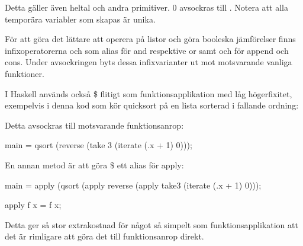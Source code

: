 \documentclass[../Core]{subfiles}
\begin{document}
Detta gäller även heltal och andra primitiver. $0$ avsockras till
. Notera att alla temporära variabler som skapas är unika.
            
    
För att göra det lättare att operera på listor och göra booleska
jämförelser finns infixoperatorerna \ic{\&\&} och \ic{||} som alias för and respektive or
samt \ic{++} och \ic{:} för append och cons. Under avsockringen byts dessa
infixvarianter ut mot motsvarande vanliga funktioner. 


I Haskell används också \$ flitigt som funktionsapplikation med låg
högerfixitet, exempelvis i denna kod som kör quicksort på en
lista sorterad i fallande ordning:


Detta avsockras till motsvarande funktionsanrop:

\begin{codeEx}
main = qsort (reverse (take 3 (iterate (\x.x + 1) 0)));
\end{codeEx}
      En annan metod är att göra \$ ett alias för apply:
\begin{codeEx}
main = apply (qsort (apply reverse (apply take3 (iterate (\x.x + 1) 0)));

apply f x = f x;
\end{codeEx}

Detta ger så stor extrakostnad för något så simpelt som funktionsapplikation
att det är rimligare att göra det till funktionsanrop direkt.
        


\end{document}
